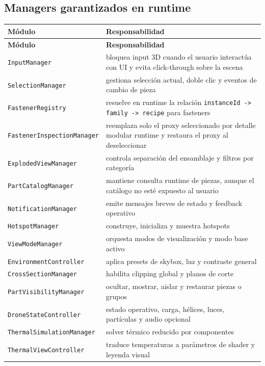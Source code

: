 \documentclass[12pt,letterpaper]{article}
\begin{document}
\subsection{Managers garantizados en runtime}

\begin{longtable}{p{5.3cm}p{7.7cm}}
\toprule
\textbf{Módulo} & \textbf{Responsabilidad} \\
\midrule
\endfirsthead
\toprule
\textbf{Módulo} & \textbf{Responsabilidad} \\
\midrule
\endhead
\texttt{InputManager} & bloquea input 3D cuando el usuario interactúa con UI y evita click-through sobre la escena \\
\texttt{SelectionManager} & gestiona selección actual, doble clic y eventos de cambio de pieza \\
\texttt{FastenerRegistry} & resuelve en runtime la relación \texttt{instanceId -> family -> recipe} para fasteners \\
\texttt{FastenerInspectionManager} & reemplaza solo el proxy seleccionado por detalle modular runtime y restaura el proxy al deseleccionar \\
\texttt{ExplodedViewManager} & controla separación del ensamblaje y filtros por categoría \\
\texttt{PartCatalogManager} & mantiene consulta runtime de piezas, aunque el catálogo no esté expuesto al usuario \\
\texttt{NotificationManager} & emite mensajes breves de estado y feedback operativo \\
\texttt{HotspotManager} & construye, inicializa y muestra hotspots \\
\texttt{ViewModeManager} & orquesta modos de visualización y modo base activo \\
\texttt{EnvironmentController} & aplica presets de skybox, luz y contraste general \\
\texttt{CrossSectionManager} & habilita clipping global y planos de corte \\
\texttt{PartVisibilityManager} & ocultar, mostrar, aislar y restaurar piezas o grupos \\
\texttt{DroneStateController} & estado operativo, carga, hélices, luces, partículas y audio opcional \\
\texttt{Thermal\-Simulation\-Manager} & solver térmico reducido por componentes \\
\texttt{ThermalViewController} & traduce temperaturas a parámetros de shader y leyenda visual \\
\bottomrule
\end{longtable}
\end{document}
